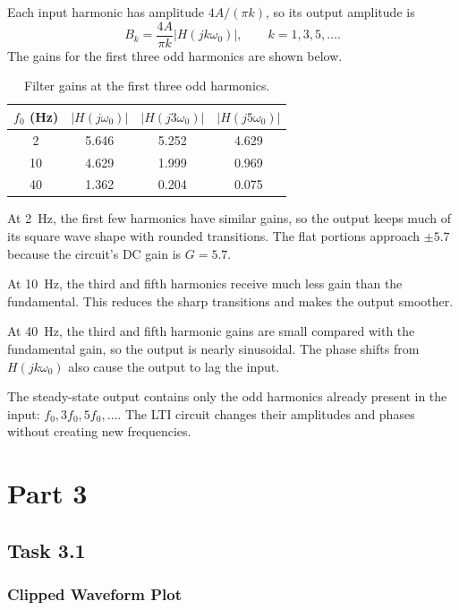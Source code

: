 \documentclass[11pt, a4paper]{article}
\begin{document}
Each input harmonic has amplitude $4A/(\pi k)$, so its output amplitude is
\[
B_k=\frac{4A}{\pi k}|H(jk\omega_0)|,
\qquad k=1,3,5,\ldots.
\]
The gains for the first three odd harmonics are shown below.

\begin{table}[H]
    \centering
    \begin{tabular}{cccc}
        \toprule
        $f_0$ (Hz) & $|H(j\omega_0)|$ & $|H(j3\omega_0)|$ & $|H(j5\omega_0)|$ \\
        \midrule
        2  & 5.646 & 5.252 & 4.629 \\
        10 & 4.629 & 1.999 & 0.969 \\
        40 & 1.362 & 0.204 & 0.075 \\
        \bottomrule
    \end{tabular}
    \caption{Filter gains at the first three odd harmonics.}
    \label{tab:harmonic_gains}
\end{table}

At \SI{2}{\hertz}, the first few harmonics have similar gains, so the output keeps much of its square wave shape with rounded transitions. The flat portions approach $\pm5.7$ because the circuit's DC gain is $G=5.7$.

At \SI{10}{\hertz}, the third and fifth harmonics receive much less gain than the fundamental. This reduces the sharp transitions and makes the output smoother.

At \SI{40}{\hertz}, the third and fifth harmonic gains are small compared with the fundamental gain, so the output is nearly sinusoidal. The phase shifts from $H(jk\omega_0)$ also cause the output to lag the input.

The steady-state output contains only the odd harmonics already present in the input: $f_0,3f_0,5f_0,\ldots$. The LTI circuit changes their amplitudes and phases without creating new frequencies.
\section*{Part 3}

\subsection*{Task 3.1}

\subsubsection*{Clipped Waveform Plot}
\end{document}
